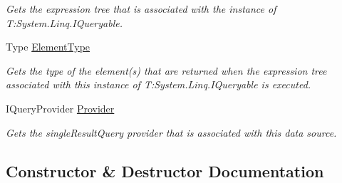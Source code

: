 \begin{DoxyCompactItemize}
\begin{DoxyCompactList}\small\item\em Gets the expression tree that is associated with the instance of T\+:\+System.\+Linq.\+I\+Queryable. \end{DoxyCompactList}\item 
Type \hyperlink{classCqrs_1_1Azure_1_1DocumentDb_1_1DataStores_1_1AzureDocumentDbDataStore_a6c007c12b342eeeb936ba748e5391bc3_a6c007c12b342eeeb936ba748e5391bc3}{Element\+Type}
\begin{DoxyCompactList}\small\item\em Gets the type of the element(s) that are returned when the expression tree associated with this instance of T\+:\+System.\+Linq.\+I\+Queryable is executed. \end{DoxyCompactList}\item 
I\+Query\+Provider \hyperlink{classCqrs_1_1Azure_1_1DocumentDb_1_1DataStores_1_1AzureDocumentDbDataStore_ac7beb3868691d1cba378fa58e3f0e999_ac7beb3868691d1cba378fa58e3f0e999}{Provider}
\begin{DoxyCompactList}\small\item\em Gets the single\+Result\+Query provider that is associated with this data source. \end{DoxyCompactList}\end{DoxyCompactItemize}


\subsection{Constructor \& Destructor Documentation}
\mbox{\label{classCqrs_1_1Azure_1_1DocumentDb_1_1DataStores_1_1AzureDocumentDbDataStore_add3f66df634a9e9ca0cbd4498e4478f6_add3f66df634a9e9ca0cbd4498e4478f6}} 
